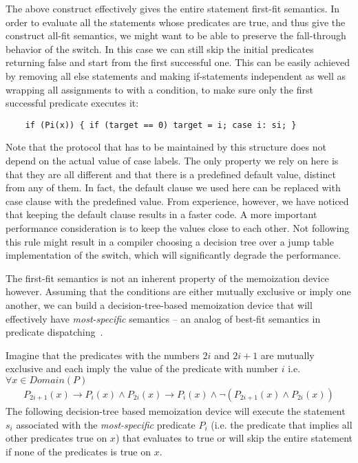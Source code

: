 The above construct effectively gives the entire statement first-fit semantics. 
In order to evaluate all the statements whose predicates are true, and thus 
give the construct all-fit semantics, we might want to be able to preserve the 
fall-through behavior of the switch. In this case we can still skip the initial 
predicates returning false and start from the first successful one. This can be 
easily achieved by removing all else statements and making if-statements 
independent as well as wrapping all assignments to  with a condition, 
to make sure only the first successful predicate executes it:

\begin{lstlisting}
    if (Pi(x)) { if (target == 0) target = i; case i: si; }
\end{lstlisting}

\noindent
Note that the protocol that has to be maintained by this structure does not 
depend on the actual value of case labels. The only property we rely on here is 
that they are all different and that there is a predefined default value, 
distinct from any of them. In fact, the default clause we used here can be 
replaced with case clause with the predefined value. From experience, however, 
we have noticed that keeping the default clause results in a faster code. A more 
important performance consideration is to keep the values close to each other. 
Not following this rule might result in a compiler choosing a decision tree over a 
jump table implementation of the switch, which will significantly degrade the 
performance.

The first-fit semantics is not an inherent property of the memoization device however. 
Assuming that the conditions are either mutually exclusive or imply one another, we 
can build a decision-tree-based memoization device that will effectively have 
\emph{most-specific} semantics -- an analog of best-fit semantics in predicate 
dispatching~\cite{ErnstKC98}.

Imagine that the predicates with the numbers $2i$ and $2i+1$ are mutually exclusive and 
each imply the value of the predicate with number $i$ i.e. $\forall x \in Domain(P)$
\begin{eqnarray*}
P_{2i+1}(x)\rightarrow P_i(x) \wedge P_{2i}(x)\rightarrow P_i(x) \wedge \neg(P_{2i+1}(x) \wedge P_{2i}(x))
\end{eqnarray*}
\noindent
The following decision-tree based memoization device will execute the statement 
$s_i$ associated with the \emph{most-specific} predicate $P_i$ (i.e. the 
predicate that implies all other predicates true on $x$) that evaluates to true or will 
skip the entire statement if none of the predicates is true on $x$.

